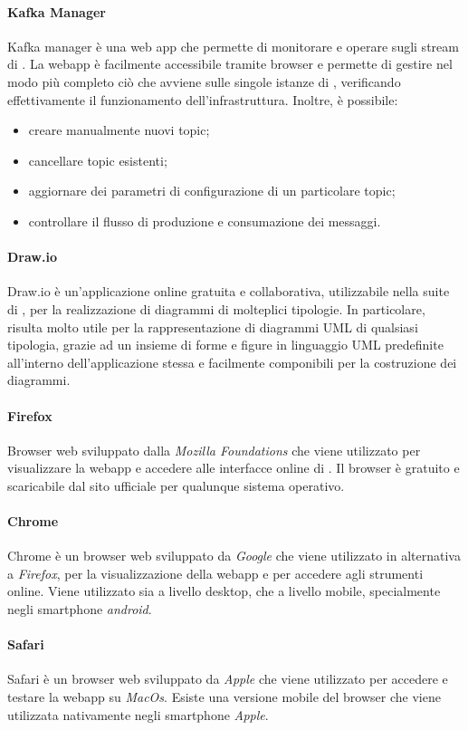 				\paragraph{Kafka Manager}
					Kafka manager è una web app che permette di monitorare e operare sugli stream di . La webapp è facilmente accessibile tramite browser e permette di gestire nel modo più completo ciò che avviene sulle singole istanze di , verificando effettivamente il funzionamento dell'infrastruttura. Inoltre, è possibile:
					\begin{itemize}
					 	\item creare manualmente nuovi topic;
					 	\item cancellare topic esistenti;
					 	\item aggiornare dei parametri di configurazione di un particolare topic;
					 	\item controllare il flusso di produzione e consumazione dei messaggi.
					 \end{itemize} 
				
				\paragraph{Draw.io} 
					Draw.io è un'applicazione online gratuita e collaborativa, utilizzabile nella suite di , per la realizzazione di diagrammi di molteplici tipologie. 
					\newline
					In particolare, risulta molto utile per la rappresentazione di diagrammi UML di qualsiasi tipologia, grazie ad un insieme di forme e figure in linguaggio UML predefinite all'interno dell'applicazione stessa e facilmente componibili per la costruzione dei diagrammi.
				
				\paragraph{Firefox} 
					Browser web sviluppato dalla \textit{Mozilla Foundations} che viene utilizzato per visualizzare la webapp e accedere alle interfacce online di . Il browser è gratuito e scaricabile dal sito ufficiale per qualunque sistema operativo.

				\paragraph{Chrome} 
					Chrome è un browser web sviluppato da \textit{Google} che viene utilizzato in alternativa a \textit{Firefox}, per la visualizzazione della webapp e per accedere agli strumenti online. Viene utilizzato sia a livello desktop, che a livello mobile, specialmente negli smartphone \textit{android}.

				\paragraph{Safari} 
					Safari è un browser web sviluppato da \textit{Apple} che viene utilizzato per accedere e testare la webapp su \textit{MacOs}. Esiste una versione mobile del browser che viene utilizzata nativamente negli smartphone \textit{Apple}.